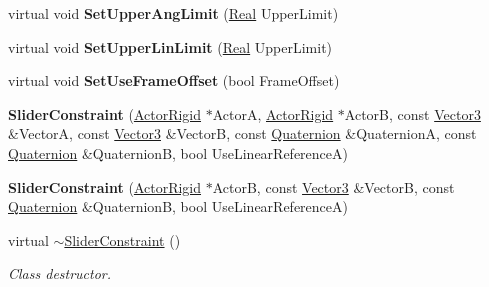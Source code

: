 \begin{DoxyCompactItemize}
\item 
\hypertarget{classphys_1_1SliderConstraint_a2800b68f67f4fea4f3d94b9cc49ff42c}{
virtual void {\bfseries SetUpperAngLimit} (\hyperlink{namespacephys_af7eb897198d265b8e868f45240230d5f}{Real} UpperLimit)}
\label{classphys_1_1SliderConstraint_a2800b68f67f4fea4f3d94b9cc49ff42c}

\item 
\hypertarget{classphys_1_1SliderConstraint_ada810899070a3bd97739e31dce2825b4}{
virtual void {\bfseries SetUpperLinLimit} (\hyperlink{namespacephys_af7eb897198d265b8e868f45240230d5f}{Real} UpperLimit)}
\label{classphys_1_1SliderConstraint_ada810899070a3bd97739e31dce2825b4}

\item 
\hypertarget{classphys_1_1SliderConstraint_a2662dcf07cca2da191dcd5e1e5f84b94}{
virtual void {\bfseries SetUseFrameOffset} (bool FrameOffset)}
\label{classphys_1_1SliderConstraint_a2662dcf07cca2da191dcd5e1e5f84b94}

\item 
\hypertarget{classphys_1_1SliderConstraint_ad1f8a2af927190365225b1310a0a2765}{
{\bfseries SliderConstraint} (\hyperlink{classphys_1_1ActorRigid}{ActorRigid} $\ast$ActorA, \hyperlink{classphys_1_1ActorRigid}{ActorRigid} $\ast$ActorB, const \hyperlink{classphys_1_1Vector3}{Vector3} \&VectorA, const \hyperlink{classphys_1_1Vector3}{Vector3} \&VectorB, const \hyperlink{classphys_1_1Quaternion}{Quaternion} \&QuaternionA, const \hyperlink{classphys_1_1Quaternion}{Quaternion} \&QuaternionB, bool UseLinearReferenceA)}
\label{classphys_1_1SliderConstraint_ad1f8a2af927190365225b1310a0a2765}

\item 
\hypertarget{classphys_1_1SliderConstraint_a907e08cc7e6784fff0d24a0c194a6b9c}{
{\bfseries SliderConstraint} (\hyperlink{classphys_1_1ActorRigid}{ActorRigid} $\ast$ActorB, const \hyperlink{classphys_1_1Vector3}{Vector3} \&VectorB, const \hyperlink{classphys_1_1Quaternion}{Quaternion} \&QuaternionB, bool UseLinearReferenceA)}
\label{classphys_1_1SliderConstraint_a907e08cc7e6784fff0d24a0c194a6b9c}

\item 
virtual \hyperlink{classphys_1_1SliderConstraint_ac636e7fe4fa5119860201c10b6b64208}{$\sim$SliderConstraint} ()
\begin{DoxyCompactList}\small\item\em Class destructor. \item\end{DoxyCompactList}\end{DoxyCompactItemize}
